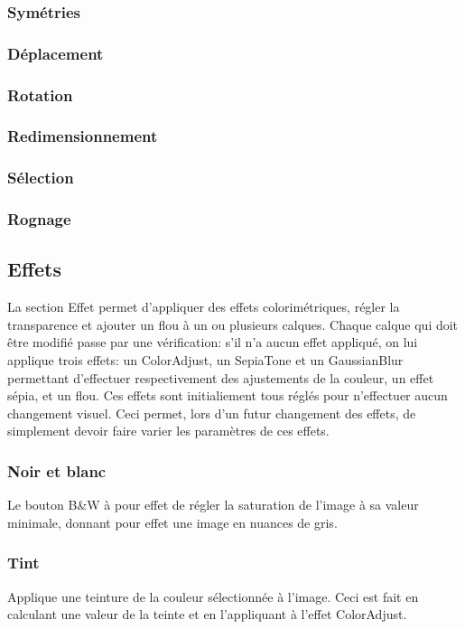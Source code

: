 \subsubsection{Symétries}
\subsubsection{Déplacement}
\subsubsection{Rotation}
\subsubsection{Redimensionnement}
\subsubsection{Sélection}
\subsubsection{Rognage}

\subsection{Effets}
La section \og Effet \fg{} permet d'appliquer des effets colorimétriques, régler la transparence et ajouter un flou à un ou plusieurs calques. Chaque calque qui doit être modifié passe par une vérification: s'il n'a aucun effet appliqué, on lui applique trois effets: un ColorAdjust, un SepiaTone et un GaussianBlur permettant d'effectuer respectivement des ajustements de la couleur, un effet sépia, et un flou. Ces effets sont initialiement tous réglés pour n'effectuer aucun changement visuel. Ceci permet, lors d'un futur changement des effets, de simplement devoir faire varier les paramètres de ces effets. 

\subsubsection{Noir et blanc}
Le bouton \og B\&W \fg{} à pour effet de régler la saturation de l'image à sa valeur minimale, donnant pour effet une image en nuances de gris.

\subsubsection{Tint}
Applique une teinture de la couleur sélectionnée à l'image. Ceci est fait en calculant une valeur de la teinte et en l'appliquant à l'effet ColorAdjust.

